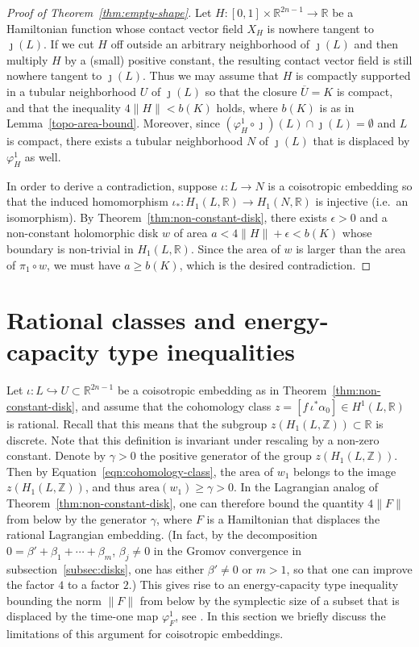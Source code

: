\documentclass{amsart}
\theoremstyle{remark}
\def\area{{\textrm{area}}}
\def\R{{\mathbb R}}
\def\Z{{\mathbb Z}}
\begin{document}
\begin{proof}[Proof of Theorem~\ref{thm:empty-shape}]
Let $H \colon [0, 1] \times \R^{2 n - 1} \to \R$ be a Hamiltonian function whose contact vector field $X_H$ is nowhere tangent to $\jmath (L)$.
If we cut $H$ off outside an arbitrary neighborhood of $\jmath (L)$ and then multiply $H$ by a (small) positive constant, the resulting contact vector field is still nowhere tangent to $\jmath (L)$.
Thus we may assume that $H$ is compactly supported in a tubular neighborhood $U$ of $\jmath (L)$ so that the closure $\overline{U} = K$ is compact, and that the inequality $4 \| H \| < b (K)$ holds, where $b (K)$ is as in Lemma~\ref{topo-area-bound}.
Moreover, since $(\varphi_H^1 \circ \jmath) (L) \cap \jmath (L) = \emptyset$ and $L$ is compact, there exists a tubular neighborhood $N$ of $\jmath (L)$ that is displaced by $\varphi_H^1$ as well.

In order to derive a contradiction, suppose $\iota \colon L \to N$ is a coisotropic embedding so that the induced homomorphism $\iota_* \colon H_1 (L, \R) \to H_1 (N, \R)$ is injective (i.e.\ an isomorphism).
By Theorem~\ref{thm:non-constant-disk}, there exists $\epsilon > 0$ and a non-constant holomorphic disk $w$ of area $a < 4 \| H \| + \epsilon < b (K)$ whose boundary is non-trivial in $H_1 (L, \R)$.
Since the area of $w$ is larger than the area of $\pi_1 \circ w$, we must have $a \ge b (K)$, which is the desired contradiction.
\end{proof}

\section{Rational classes and energy-capacity type inequalities} \label{sec:limitations}

Let $\iota \colon L \hookrightarrow U \subset \R^{2 n - 1}$ be a coisotropic embedding as in Theorem~\ref{thm:non-constant-disk}, and assume that the cohomology class $z = [f \, \iota^* \alpha_0] \in H^1 (L, \R)$ is rational.
Recall that this means that the subgroup $z (H_1 (L, \Z)) \subset \R$ is discrete.
Note that this definition is invariant under rescaling by a non-zero constant.
Denote by $\gamma > 0$ the positive generator of the group $z (H_1 (L, \Z))$.
Then by Equation~\ref{eqn:cohomology-class}, the area of $w_1$ belongs to the image $z (H_1 (L, \Z))$, and thus $\area (w_1) \ge \gamma > 0$.
In the Lagrangian analog of Theorem~\ref{thm:non-constant-disk}, one can therefore bound the quantity $4 \| F \|$ from below by the generator $\gamma$, where $F$ is a Hamiltonian that displaces the rational Lagrangian embedding.
(In fact, by the decomposition $0 = \beta' + \beta_1 + \cdots + \beta_m$, $\beta_j \not= 0$ in the Gromov convergence in subsection~\ref{subsec:disks}, one has either $\beta' \not= 0$ or $m > 1$, so that one can improve the factor $4$ to a factor $2$.)
This gives rise to an energy-capacity type inequality bounding the norm $\| F \|$ from below by the symplectic size of a subset that is displaced by the time-one map $\varphi_F^1$, see \cite[Subsection~3.2.D]{polterovich:ggs01}.
In this section we briefly discuss the limitations of this argument for coisotropic embeddings.
\end{document}
